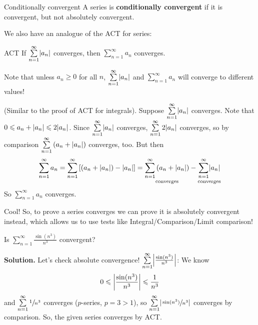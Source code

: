 \begin{Definition}{Conditionally convergent}{}
    A series is \textbf{conditionally convergent} if it is convergent, but
    not absolutely convergent.
\end{Definition}

We also have an analogue of the ACT for series:

\begin{Theorem}{ACT}{}
    If $ \sum\limits_{n=1}^{\infty} \abs{a_n} $ converges, then $ \sum\limits_{n=1}^{\infty}a_n $
    converges.
\end{Theorem}

\begin{Remark}{}{}
    Note that unless $ a_n\geqslant 0 $ for all $ n $, $ \sum\limits_{n=1}^{\infty} \abs{a_n} $
    and $ \sum\limits_{n=1}^{\infty} a_n $ will converge to different values!
\end{Remark}

\begin{Proof}{}{}
    (Similar to the proof of ACT for integrals). Suppose $ \sum\limits_{n=1}^{\infty}\abs{a_n} $
    converges. Note that $ 0\leqslant a_n+\abs{a_n}\leqslant 2\abs{a_n} $. Since
    $ \sum\limits_{n=1}^{\infty} \abs{a_n} $ converges, $ \sum\limits_{n=1}^{\infty} 2\abs{a_n} $
    converges, so by comparison $ \sum\limits_{n=1}^{\infty} \left( a_n+\abs{a_n} \right) $
    converges, too. But then
    \[ \sum\limits_{n=1}^{\infty}a_n
        =\sum\limits_{n=1}^{\infty} \left[ (a_n+\abs{a_n}) -\abs{a_n}\right]
        =\underset{\text{converges}}{\sum\limits_{n=1}^{\infty} \left( a_n+\abs{a_n} \right)}
        -\underset{\text{converges}}{\sum\limits_{n=1}^{\infty} \abs{a_n}}\]
    So $ \sum\limits_{n=1}^{\infty} a_n $ converges.
\end{Proof}

Cool! So, to prove a series converges we can prove it is absolutely convergent
instead, which allows us to use tests like Integral/Comparison/Limit comparison!

\begin{Example}{}{}
    Is $ \displaystyle \sum\limits_{n=1}^{\infty} \frac{\sin(n^3)}{n^3} $ convergent?

    \textbf{Solution.} Let's check absolute convergence!
    $ \sum\limits_{n=1}^{\infty} \abs*{\frac{\sin(n^3)}{n^3}} $: We know
    \[ 0\leqslant \abs*{\frac{\sin(n^3)}{n^3}}\leqslant \frac{1}{n^3} \]
    and $ \sum\limits_{n=1}^{\infty} \sfrac{1}{n^3} $ converges ($ p $-series, $ p=3>1 $),
    so $ \sum\limits_{n=1}^{\infty} \abs*{\sfrac{\sin(n^3)}{n^3} } $
    converges by comparison. So, the given series converges by ACT\@.
\end{Example}

